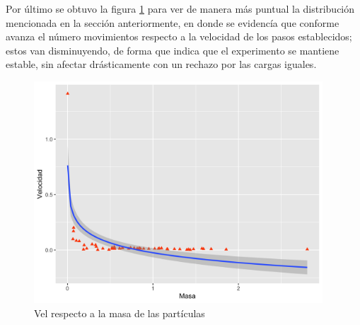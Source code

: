 \documentclass[12pt, letterpaper] {article}
\begin{document}
Por último se obtuvo la figura \ref{VelMasa}  para ver de manera más puntual la distribución mencionada en la sección anteriormente, en donde se evidencía que conforme avanza el número movimientos respecto a la velocidad de los pasos establecidos; estos van disminuyendo, de forma que indica que el experimento se mantiene estable, sin afectar drásticamente con un rechazo por las cargas iguales. 

\begin{figure}[H]
\centering\includegraphics[width=108mm]{Veldep.png}
\caption{Vel respecto a la masa de las partículas}
\label{VelMasa}
\end{figure}






\end{document}
